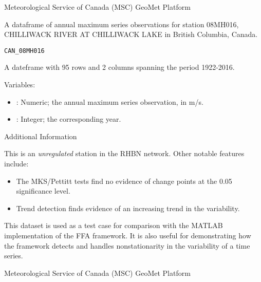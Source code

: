 \documentclass[a4paper]{book}
\begin{document}
%
\begin{Source}
Meteorological Service of Canada (MSC) GeoMet Platform
\end{Source}
%
\begin{Description}
A dataframe of annual maximum series observations for
station 08MH016, CHILLIWACK RIVER AT CHILLIWACK LAKE in British Columbia, Canada.
\end{Description}
%
\begin{Usage}
\begin{verbatim}
CAN_08MH016
\end{verbatim}
\end{Usage}
%
\begin{Format}
A dateframe with 95 rows and 2 columns spanning the period 1922-2016.
\end{Format}
%
\begin{Details}
Variables:
\begin{itemize}

\item{} : Numeric; the annual maximum series observation, in m/s.
\item{} : Integer; the corresponding year.

\end{itemize}

\end{Details}
%
\begin{Section}{Additional Information}

This is an \emph{unregulated} station in the RHBN network. Other notable features include:
\begin{itemize}

\item{} The MKS/Pettitt tests find no evidence of change points at the 0.05 significance level.
\item{} Trend detection finds evidence of an increasing trend in the variability.

\end{itemize}


This dataset is used as a test case for comparison with the MATLAB implementation of the
FFA framework. It is also useful for demonstrating how the framework detects and handles
nonstationarity in the variability of a time series.
\end{Section}
%
\begin{Source}
Meteorological Service of Canada (MSC) GeoMet Platform
\end{Source}
\end{document}
